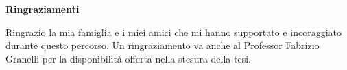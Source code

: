 \thispagestyle{empty}

\begin{center}
  {\bf \Huge Ringraziamenti}
\end{center}

\vspace{4cm}
Ringrazio la mia famiglia e i miei amici che mi hanno supportato e incoraggiato durante questo percorso. Un ringraziamento va anche al Professor Fabrizio Granelli per la disponibilità offerta nella stesura della tesi.
